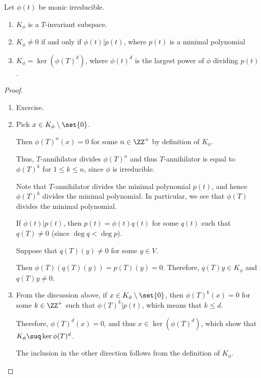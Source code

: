 \documentclass[11pt]{scrartcl}
\begin{document}
\begin{theorem}
Let $\phi(t)$ be monic irreducible.

\begin{enumerate}[label=\alph*)]
\item $K_{\phi}$ is a $T$-invariant subspace.
\item $K_{\phi}  \neq 0$ if and only if $\phi(t)|p(t)$, where $p(t)$ is a minimal polynomial
\item $K_{\phi} = \ker(\phi(T)^d)$, where $\phi(t)^d$ is the largest power of $\phi$ dividing $p(t)$.
\end{enumerate}
\end{theorem}

\begin{proof}
  \hfill

  \begin{enumerate}[label=\alph*)]
  \item Exercise.
  \item Pick $x\in K_{\phi}\setminus \set{0}$.

    Then $\phi(T)^n(x) = 0$ for some $n \in \ZZ^+$ by definition of
    $K_{\phi}$.

    Thus, $T$-annihilator divides $\phi(T)^n$ and thus $T$-annihilator
    is equal to $\phi(T)^k$ for $1 \leq k \leq n$, since $\phi$ is
    irreducible.

    Note that $T$-annihilator divides the minimal polynomial $p(t)$,
    and hence $\phi(T)^k$ divides the minimal polynomial. In
    particular, we see that $\phi(T)$ divides the minimal polynomial.

    If $\phi(t)|p(t)$, then $p(t) = \phi(t)q(t)$ for some $q(t)$ such
    that $q(T) \neq 0$ (since $\deg q < \deg p$).

    Suppose that $q(T)(y) \neq 0$ for some $y\in V$.

    Then $\phi(T)(q(T)(y)) = p(T)(y) = 0$. Therefore,
    $q(T)y \in K_{\phi}$ and $q(T)y \neq 0$.
  \item From the discussion above, if
    $x\in K_{\phi} \setminus \set{0}$, then $\phi(T)^k(x) = 0$ for
    some $k\in \ZZ^+$ such that $\phi(T)^k | p(t)$, which means that
    $k \leq d$.

    Therefore, $\phi(T)^d(x) = 0$, and thus $x\in \ker (\phi(T)^d)$,
    which show that $K_{\phi} \suq \ker \phi(T)^d$. 

    The inclusion in the other direction follows from the definition of $K_{\phi}$.
  \end{enumerate}
\end{proof}
\end{document}
